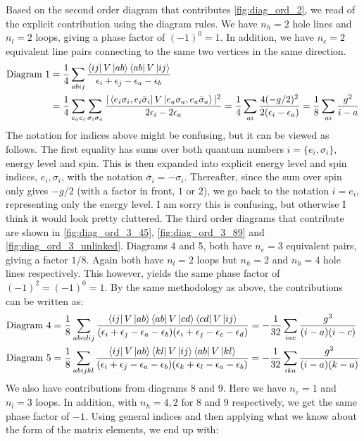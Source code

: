 \documentclass{article}
\newcommand{\inner}[3]{\bra{#1}#2\ket{#3}}
\newcommand{\set}[1]{\{ #1 \}}
\begin{document}
    Based on the second order diagram that contributes \cref{fig:diag_ord_2}, we read of the explicit contribution using the diagram rules. We have $n_h = 2$ hole lines and $n_l = 2$ loops, giving a phase factor of $(-1)^0 = 1$. In addition, we have $n_e = 2$ equivalent line pairs connecting to the same two vertices in the same direction. 
    \begin{align*}
        \text{Diagram 1}& = \frac{1}{4} \sum_{abij} \frac{\inner{ij}{V}{ab}\inner{ab}{V}{ij}}{\epsilon_i + \epsilon_j - \epsilon_a - \epsilon_b} \\
            &= \frac{1}{4}\sum_{e_a e_i}\sum_{\sigma_i \sigma_a} \frac{|\inner{e_i\sigma_i, e_i\bar{\sigma}_i}{V}{e_a\sigma_a, e_a\bar{\sigma}_a}|^2}{2\epsilon_i - 2\epsilon_a} = \frac{1}{4}\sum_{ai} \frac{4(-g/2)^2}{2(\epsilon_i-\epsilon_a)} = \frac{1}{8}\sum_{ai} \frac{g^2}{i-a}
    \end{align*}
    The notation for indices above might be confusing, but it can be viewed as follows. The first equality has sums over both quantum numbers $i = \set{e_i, \sigma_i}$, energy level and spin. This is then expanded into explicit energy level and spin indices, $e_i, \sigma_i$, with the notation $\bar{\sigma}_i = -\sigma_i$. Thereafter, since the sum over spin only gives $-g/2$ (with a factor in front, $1$ or $2$), we go back to the notation $i = e_i$, representing only the energy level. I am sorry this is confusing, but otherwise I think it would look pretty cluttered. The third order diagrams that contribute are shown in \cref{fig:diag_ord_3_45}, \cref{fig:diag_ord_3_89} and \cref{fig:diag_ord_3_unlinked}. Diagrams 4 and 5, both have $n_e = 3$ equivalent pairs, giving a factor $1/8$. Again both have $n_l = 2$ loops but $n_h = 2$ and $n_h = 4$ hole lines respectively. This however, yields the same phase factor of $(-1)^2 = (-1)^0 = 1$. By the same methodology as above, the contributions can be written as: 
    \begin{align*}
        \text{Diagram 4} &= \frac{1}{8} \sum_{abcdij} \frac{\inner{ij}{V}{ab}\inner{ab}{V}{cd}\inner{cd}{V}{ij}}{(\epsilon_i + \epsilon_j - \epsilon_a - \epsilon_b)(\epsilon_i + \epsilon_j - \epsilon_c - \epsilon_d)} = -\frac{1}{32}\sum_{iac}\frac{g^3}{(i-a)(i-c)}\\
        \text{Diagram 5} &= \frac{1}{8} \sum_{abijkl} \frac{\inner{ij}{V}{ab}\inner{kl}{V}{ij}\inner{ab}{V}{kl}}{(\epsilon_i + \epsilon_j - \epsilon_a - \epsilon_b)(\epsilon_k + \epsilon_l - \epsilon_a - \epsilon_b)} = -\frac{1}{32}\sum_{ika}\frac{g^3}{(i-a)(k-a)}
    \end{align*}
    We also have contributions from diagrams 8 and 9. Here we have $n_e = 1$ and $n_l = 3$ loops. In addition, with $n_h = 4, 2$ for 8 and 9 respectively, we get the same phase factor of $-1$. Using general indices and then applying what we know about the form of the matrix elements, we end up with:  
\end{document}

